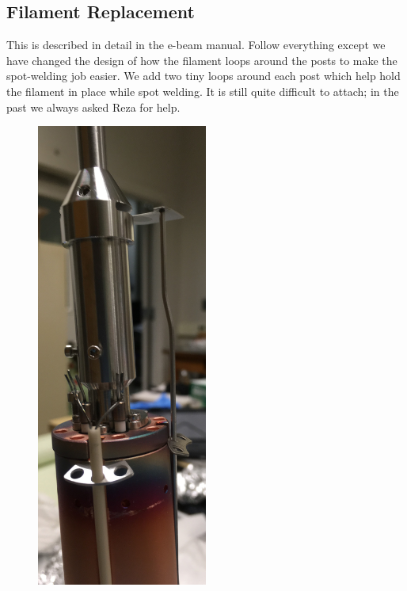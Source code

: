 \subsection{Filament Replacement}
This is described in detail in the e-beam manual. Follow everything except we have changed the design of how the filament loops around the posts to make the spot-welding job easier. We add two tiny loops around each post which help hold the filament in place while spot welding. It is still quite difficult to attach; in the past we always asked Reza for help.
\begin{figure}[H]
\begin{minipage}[b]{0.33\linewidth}
	\centering
	\includegraphics[width=0.5\textwidth]{partially_dissasembled.jpg}
\end{minipage}\hfill
\begin{minipage}[b]{0.33\linewidth}
	\centering

\end{minipage}
\end{figure}
